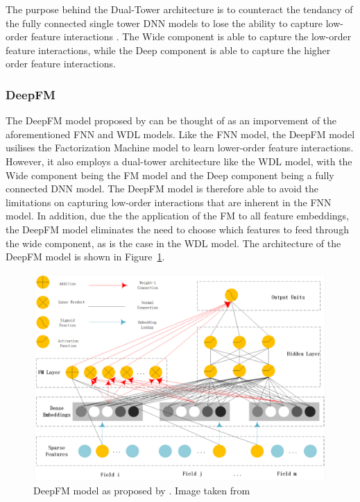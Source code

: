 \documentclass{mldsmsc}
\begin{document}
The purpose behind the Dual-Tower architecture is to counteract the tendancy of the fully connected
single tower DNN models to lose the ability to capture low-order feature interactions \citep{RefWorks:zhang2021deep}.
The Wide component is able to capture the low-order feature interactions, while the Deep component is able to capture
the higher order feature interactions.

\subsubsection{DeepFM}

The DeepFM model proposed by \cite{RefWorks:guo2017deepfm:} can be thought of as an
imporvement of the aforementioned FNN \citep{RefWorks:zhang2016deep} and WDL \citep{RefWorks:cheng2016wide} models.
Like the FNN model, the DeepFM model usilises the Factorization Machine model \citep{RefWorks:rendle2010factorization}
to learn lower-order feature interactions. However, it also employs a dual-tower architecture
like the WDL model, with the Wide component being the FM model and the Deep component being a fully connected
DNN model. The DeepFM model is therefore able to avoid the limitations on capturing low-order
interactions that are inherent in the FNN model. In addition, due the the application of the FM to all
feature embeddings, the DeepFM model eliminates the need to choose which features 
to feed through the wide component, as is the case in the WDL model. The architecture of the DeepFM model is shown 
in Figure~\ref{fig:deepfm}.

\begin{figure}[h]
\centering
\includegraphics[width=\textwidth]{../figures/dfm.png}
\caption{DeepFM model as proposed by \cite{RefWorks:guo2017deepfm:}. Image taken from \cite{RefWorks:shen2017deepctr:}}
\label{fig:deepfm}
\end{figure}
\end{document}
